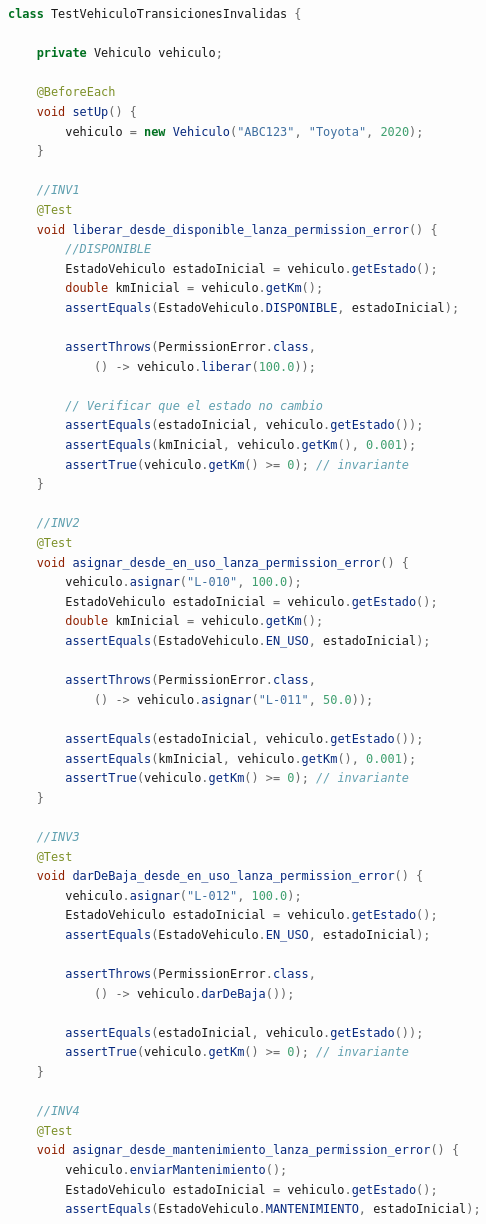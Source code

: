 \begin{lstlisting}[language=Java, caption={TestVehiculoTransicionesInvalidas.java}]
class TestVehiculoTransicionesInvalidas {

    private Vehiculo vehiculo;

    @BeforeEach
    void setUp() {
        vehiculo = new Vehiculo("ABC123", "Toyota", 2020);
    }

    //INV1
    @Test
    void liberar_desde_disponible_lanza_permission_error() {
        //DISPONIBLE
        EstadoVehiculo estadoInicial = vehiculo.getEstado();
        double kmInicial = vehiculo.getKm();
        assertEquals(EstadoVehiculo.DISPONIBLE, estadoInicial);

        assertThrows(PermissionError.class,
            () -> vehiculo.liberar(100.0));

        // Verificar que el estado no cambio
        assertEquals(estadoInicial, vehiculo.getEstado());
        assertEquals(kmInicial, vehiculo.getKm(), 0.001);
        assertTrue(vehiculo.getKm() >= 0); // invariante
    }

    //INV2
    @Test
    void asignar_desde_en_uso_lanza_permission_error() {
        vehiculo.asignar("L-010", 100.0);
        EstadoVehiculo estadoInicial = vehiculo.getEstado();
        double kmInicial = vehiculo.getKm();
        assertEquals(EstadoVehiculo.EN_USO, estadoInicial);

        assertThrows(PermissionError.class,
            () -> vehiculo.asignar("L-011", 50.0));

        assertEquals(estadoInicial, vehiculo.getEstado());
        assertEquals(kmInicial, vehiculo.getKm(), 0.001);
        assertTrue(vehiculo.getKm() >= 0); // invariante
    }

    //INV3
    @Test
    void darDeBaja_desde_en_uso_lanza_permission_error() {
        vehiculo.asignar("L-012", 100.0);
        EstadoVehiculo estadoInicial = vehiculo.getEstado();
        assertEquals(EstadoVehiculo.EN_USO, estadoInicial);

        assertThrows(PermissionError.class,
            () -> vehiculo.darDeBaja());

        assertEquals(estadoInicial, vehiculo.getEstado());
        assertTrue(vehiculo.getKm() >= 0); // invariante
    }

    //INV4
    @Test
    void asignar_desde_mantenimiento_lanza_permission_error() {
        vehiculo.enviarMantenimiento();
        EstadoVehiculo estadoInicial = vehiculo.getEstado();
        assertEquals(EstadoVehiculo.MANTENIMIENTO, estadoInicial);


\end{lstlisting}
